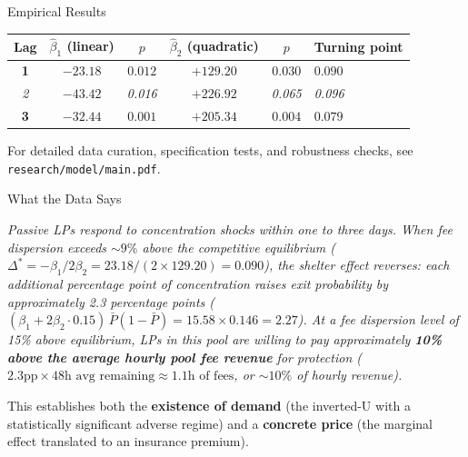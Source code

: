 \documentclass[aspectratio=169]{beamer}
\newcommand{\DeltaStar}{\Delta^{*}}
\begin{document}
\begin{frame}{Empirical Results}

\begin{center}
\begin{tabular}{@{}cccccl@{}}
\toprule
Lag & $\hat{\beta}_1$ (linear) & $p$ & $\hat{\beta}_2$ (quadratic) & $p$ & Turning point \\
\midrule
\textbf{1} & $\mathbf{-23.18}$ & $\mathbf{0.012}$ & $\mathbf{+129.20}$ & $\mathbf{0.030}$ & $\mathbf{0.090}$ \\
\textit{2} & \textit{$-43.42$} & \textit{0.016} & \textit{$+226.92$} & \textit{0.065} & \textit{0.096} \\
\textbf{3} & $\mathbf{-32.44}$ & $\mathbf{0.001}$ & $\mathbf{+205.34}$ & $\mathbf{0.004}$ & $\mathbf{0.079}$ \\
\bottomrule
\end{tabular}
\end{center}

\medskip

{\footnotesize For detailed data curation, specification tests, and robustness
checks, see \texttt{research/model/main.pdf}.}

\end{frame}

\begin{frame}{What the Data Says}

\textit{Passive LPs respond to concentration shocks within one to three days.
When fee dispersion exceeds
${\sim}9\%$ above the competitive equilibrium
{\footnotesize ($\DeltaStar = -\beta_1/2\beta_2 = 23.18/(2 \times 129.20) = 0.090$)},
the shelter effect reverses: each additional percentage point of concentration
raises exit probability by approximately 2.3 percentage points
{\footnotesize ($(\beta_1 + 2\beta_2 \cdot 0.15)\,\bar{P}(1{-}\bar{P}) = 15.58 \times 0.146 = 2.27$)}.
At a fee dispersion level of 15\% above equilibrium, LPs in this pool are
willing to pay approximately \textbf{10\% above the average hourly pool fee
revenue} for protection
{\footnotesize ($2.3\text{pp} \times 48\text{h avg remaining} \approx 1.1\text{h of fees}$, or ${\sim}10\%$ of hourly revenue)}.}

\bigskip

This establishes both the \textbf{existence of demand} (the inverted-U with
a statistically significant adverse regime) and a \textbf{concrete price}
(the marginal effect translated to an insurance premium).

\end{frame}
\end{document}
